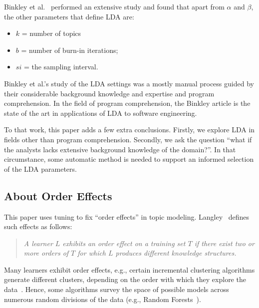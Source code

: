 \documentclass[twocolumn,5p,sort&compress]{elsarticle}
\newcommand{\bi}{\begin{itemize}}
\newcommand{\ei}{\end{itemize}}
\theoremstyle{break}
\begin{document}
Binkley et al.~\cite{binkley2014understanding} performed an extensive study and found that 
apart from $\alpha$ and $\beta$, the other parameters that define LDA
are: 
\bi
    \item $k$ = number of topics
    \item $b$ = number of burn-in iterations;
    \item $si$ = the sampling interval.
\ei
\noindent
Binkley et al.'s study of the LDA settings was a mostly manual process
guided by their considerable background knowledge and expertise and program
comprehension.
In the field of program comprehension, the Binkley article
is the state of the art in applications of LDA to software engineering.

To that work, this paper adds a few extra conclusions.
Firstly, we explore LDA in fields other than program comprehension.
Secondly, we ask the question ``what if the analysts lacks extensive background knowledge
of the domain?''. In that circumstance, some automatic method is needed to support
an informed selection of the LDA parameters.

 


\subsection{About Order Effects}

\noindent
This paper uses tuning to fix ``order effects'' in topic modeling. Langley~\cite{gennari1989models} defines such effects as follows:
\begin{quote}
{\em A learner $L$ exhibits an order effect on a training set  $T$ if there exist
two or more orders of $T$ for which $L$ produces different knowledge structures.}
\end{quote}
Many learners exhibit order effects, e.g., certain incremental clustering algorithms generate different
clusters, depending on the order with which they explore the data~\cite{gennari1989models}.
Hence, some algorithms survey the space of possible models across numerous
random divisions of the data (e.g., Random Forests~\cite{breiman2001random}).
\end{document}
